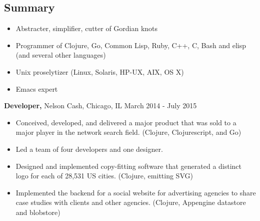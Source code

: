 \documentclass[margin]{res}
\begin{document}
 
 
 
\address{{\bf Home Address} \\ 2446 North Albany Avenue \\ Chicago, IL 60647-2602  \\
        (773) 349-2020 }
\address{{\bf Email Address} \\ me@clojure.us }

 
\begin{resume} 
 
\section{Summary} 
\begin{itemize} \itemsep -2pt %
\item Abstracter, simplifier, cutter of Gordian knots
\item Programmer of Clojure, Go, Common Lisp, Ruby, C++, C, Bash and elisp (and several other languages)
\item Unix proselytizer (Linux, Solaris, HP-UX, AIX, OS X)
\item Emacs expert
\end{itemize}

 {\bf Developer,} Nelson Cash, Chicago, IL \hfill March 2014 - July 2015
\begin{itemize} \itemsep -2pt %
\item Conceived, developed, and delivered a major product that was sold to a major player in the network search field. (Clojure, Clojurescript, and Go)
\item Led a team of four developers and one designer.
\item Designed and implemented copy-fitting software that generated a distinct logo for each of 28,531 US cities. (Clojure, emitting SVG)
\item Implemented the backend for a social website for advertising agencies to share case studies with clients and other agencies.  (Clojure, Appengine datastore and blobstore)
\end{itemize}


\end{resume}
\end{document}
